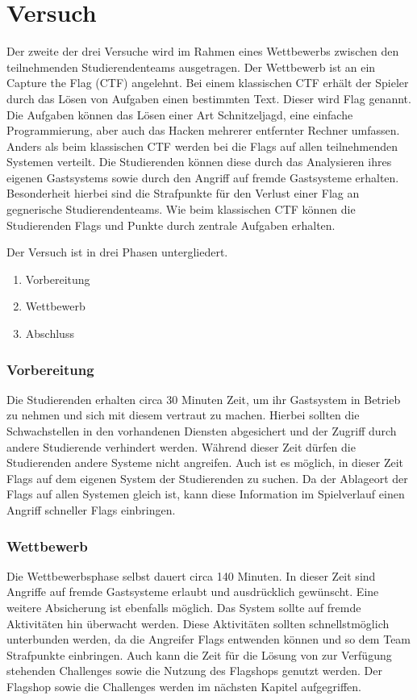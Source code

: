 \section{Versuch }
\label{sec:Versuch}

Der zweite der drei Versuche  wird im Rahmen eines Wettbewerbs zwischen den teilnehmenden Studierendenteams ausgetragen. Der Wettbewerb ist an ein Capture the Flag (CTF) angelehnt. Bei einem klassischen CTF erhält der Spieler durch das Lösen von Aufgaben einen bestimmten Text. Dieser wird Flag genannt. Die Aufgaben können das Lösen einer Art Schnitzeljagd, eine einfache Programmierung, aber auch das Hacken mehrerer entfernter Rechner umfassen. Anders als beim klassischen CTF werden bei  die Flags auf allen teilnehmenden Systemen verteilt. \cite{tanWhatCTFHow2020} Die Studierenden können diese durch das Analysieren ihres eigenen Gastsystems sowie durch den Angriff auf fremde Gastsysteme erhalten. Besonderheit hierbei sind die Strafpunkte für den Verlust einer Flag an gegnerische Studierendenteams. Wie beim klassischen CTF können die Studierenden Flags und Punkte durch zentrale Aufgaben erhalten.

Der Versuch ist in drei Phasen untergliedert.
\begin{enumerate}
	\item Vorbereitung
	\item Wettbewerb
	\item Abschluss
\end{enumerate}

\subsubsection{Vorbereitung}
Die Studierenden erhalten circa 30 Minuten Zeit, um ihr Gastsystem in Betrieb zu nehmen und sich mit diesem vertraut zu machen. Hierbei sollten die Schwachstellen in den vorhandenen Diensten abgesichert und der Zugriff durch andere Studierende verhindert werden. Während dieser Zeit dürfen die Studierenden andere Systeme nicht angreifen. Auch ist es möglich, in dieser Zeit Flags auf dem eigenen System der Studierenden zu suchen. Da der Ablageort der Flags auf allen Systemen gleich ist, kann diese Information im Spielverlauf einen Angriff schneller Flags einbringen.

\subsubsection{Wettbewerb}
Die Wettbewerbsphase selbst dauert circa 140 Minuten. In dieser Zeit sind Angriffe auf fremde Gastsysteme erlaubt und ausdrücklich gewünscht. Eine weitere Absicherung ist ebenfalls möglich. Das System sollte auf fremde Aktivitäten hin überwacht werden. Diese Aktivitäten sollten schnellstmöglich unterbunden werden, da die Angreifer Flags entwenden können und so dem Team Strafpunkte einbringen. Auch kann die Zeit für die Lösung von zur Verfügung stehenden Challenges sowie die Nutzung des Flagshops genutzt werden. Der Flagshop sowie die Challenges werden im nächsten Kapitel aufgegriffen.


